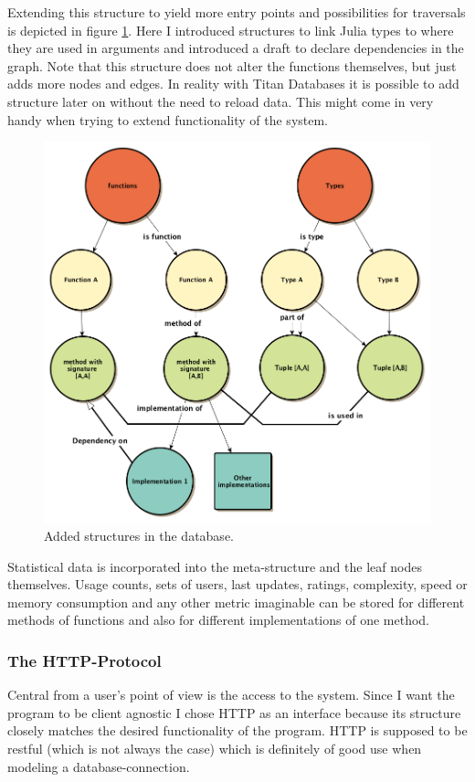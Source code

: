 \documentclass[11p]{scrartcl}
\begin{document}
Extending this structure to yield more entry points and possibilities for traversals is depicted in figure \ref{fig:dbStructure2}. Here I introduced structures to link Julia types to where they are used in arguments and introduced a draft to declare dependencies in the graph. Note that this structure does not alter the functions themselves, but just adds more nodes and edges. In reality with Titan Databases it is possible to add structure later on without the need to reload data. This might come in very handy when trying to extend functionality of the system.

\begin{figure}[h!]		
 	\includegraphics[scale=0.4]{figures/dbStructure2.png}
	\caption{Added structures in the database.}
	\label{fig:dbStructure2}
\end{figure}

Statistical data is incorporated into the meta-structure and the leaf nodes themselves. Usage counts, sets of users, last updates, ratings, complexity, speed or memory consumption and any other metric imaginable can be stored for different methods of functions and also for different implementations of one method.

\subsubsection{The HTTP-Protocol}
Central from a user's point of view is the access to the system. Since I want the program to be client agnostic I chose HTTP as an interface because its structure closely matches the desired functionality of the program. HTTP is supposed to be restful (which is not always the case) which is definitely of good use when modeling a database-connection.
\end{document}
